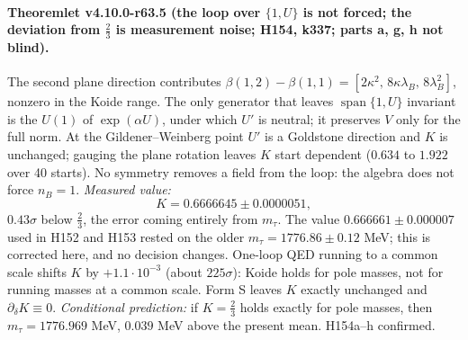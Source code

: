 \paragraph{Theoremlet v4.10.0-r63.5 (the loop over \(\{1,U\}\) is not forced; the deviation from \(\tfrac23\) is measurement noise; H154, k337; parts a, g, h not blind).}
The second plane direction contributes \(\beta(1,2)-\beta(1,1)=[2\kappa^2,\,8\kappa\lambda_B,\,8\lambda_B^2]\), nonzero in the Koide range.  The
only generator that leaves \(\operatorname{span}\{1,U\}\) invariant is the \(U(1)\) of \(\exp(\alpha U)\), under which \(U'\) is neutral; it
preserves \(V\) only for the full norm.  At the Gildener--Weinberg point \(U'\) is a Goldstone direction and \(K\) is unchanged; gauging the plane
rotation leaves \(K\) start dependent (\(0.634\) to \(1.922\) over 40 starts).  No symmetry removes a field from the loop: the algebra does not
force \(n_B=1\).  \emph{Measured value:}
\[
K=0.6666645\pm0.0000051,
\]
\(0.43\sigma\) below \(\tfrac23\), the error coming entirely from \(m_\tau\).  The value \(0.666661\pm0.000007\) used in H152 and H153 rested on
the older \(m_\tau=1776.86\pm0.12\) MeV; this is corrected here, and no decision changes.  One-loop QED running to a common scale shifts \(K\) by
\(+1.1\cdot10^{-3}\) (about \(225\sigma\)): Koide holds for pole masses, not for running masses at a common scale.  Form S leaves \(K\) exactly
unchanged and \(\partial_\delta K\equiv0\).  \emph{Conditional prediction:} if \(K=\tfrac23\) holds exactly for pole masses, then
\(m_\tau=1776.969\) MeV, \(0.039\) MeV above the present mean.  H154a--h confirmed.

